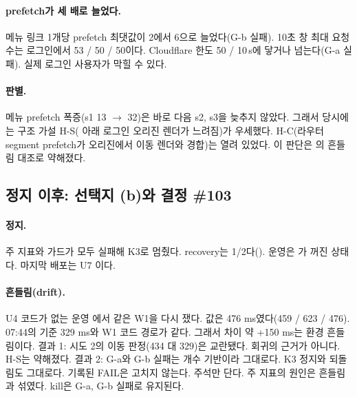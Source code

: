 \paragraph{prefetch가 세 배로 늘었다.}
메뉴 링크 1개당 prefetch 최댓값이 2에서 6으로 늘었다(G-b 실패).
10초 창 최대 요청 수는 로그인에서 53 / 50 / 50이다. Cloudflare 한도 50 / 10\,s에 닿거나 넘는다(G-a 실패).
실제 로그인 사용자가 막힐 수 있다.

\paragraph{판별.}
메뉴 prefetch 폭증(s1 13 $\to$ 32)은 바로 다음 s2, s3을 늦추지 않았다.
그래서 당시에는 구조 가설 H-S( 아래 로그인 오리진 렌더가 느려짐)가 우세했다.
H-C(라우터 segment prefetch가 오리진에서 이동 렌더와 경합)는 열려 있었다.
이 판단은 의 흔들림 대조로 약해졌다.

\subsection{정지 이후: 선택지 (b)와 결정 \#103}\label{sec:re-u4-state}

\paragraph{정지.}
주 지표와 가드가 모두 실패해 K3로 멈췄다. recovery는 1/2다().
운영은 가 꺼진 상태다. 마지막 배포는 U7 이다.

\paragraph{흔들림(drift).}
U4 코드가 없는 운영 에서 같은 W1을 다시 쟀다. 값은 476 ms였다(459 / 623 / 476).
07:44의 기준 329 ms와 W1 코드 경로가 같다. 그래서 차이 약 +150 ms는 환경 흔들림이다.
결과 1: 시도 2의 이동 판정(434 대 329)은 교란됐다. 회귀의 근거가 아니다. H-S는 약해졌다.
결과 2: G-a와 G-b 실패는 개수 기반이라 그대로다. K3 정지와 되돌림도 그대로다.
기록된 FAIL은 고치지 않는다. 주석만 단다. 주 지표의 원인은 흔들림과 섞였다. kill은 G-a, G-b 실패로 유지된다.

